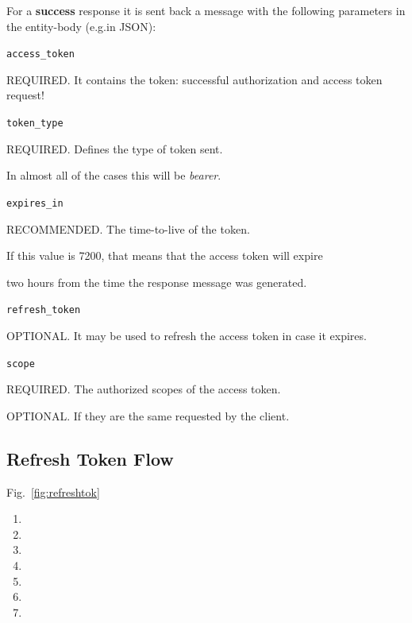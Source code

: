 For a \textbf{success} response it is sent back a message with the following parameters in the entity-body (e.g.in JSON):

\texttt{access\_token}

\hspace{0.5cm}REQUIRED. It contains the token: successful authorization and access token request! 

\texttt{token\_type}

\hspace{0.5cm}REQUIRED. Defines the type of token sent.

\hspace{0.5cm}In almost all of the cases this will be \textit{bearer}.

\texttt{expires\_in}

\hspace{0.5cm}RECOMMENDED. The time-to-live of the token.

\hspace{0.5cm}If this value is 7200, that means that the access token will expire

\hspace{0.5cm}two hours from the time the response message was generated.

\vspace{0.5cm}

\texttt{refresh\_token}

\hspace{0.5cm}OPTIONAL. It may be used to refresh the access token in case it expires.

\texttt{scope}

\hspace{0.5cm}REQUIRED. The authorized scopes of the access token.

\hspace{0.5cm}OPTIONAL. If they are the same requested by the client.


\subsection{Refresh Token Flow}
Fig.~\ref{fig:refreshtok}
\begin{enumerate}
    \item 
    \item 
    \item 
    \item 
    \item 
    \item 
    \item 
\end{enumerate}

